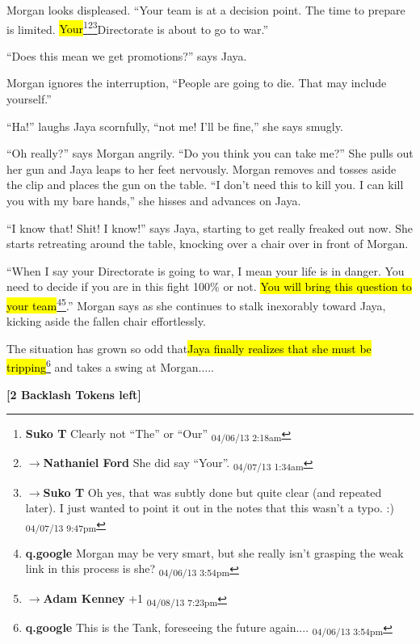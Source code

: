 Morgan looks displeased.  ``Your team is at a decision point.  The time to prepare is limited.  \hl{Your}\footnote{\textbf{Suko T }Clearly not ``The'' or ``Our'' \textsubscript{04/06/13 2:18am}}\footnote{$\rightarrow$\textbf{Nathaniel Ford }She did say ``Your''. \textsubscript{04/07/13 1:34am}}\footnote{$\rightarrow$\textbf{Suko T }Oh yes, that was subtly done but quite clear (and repeated later).  I just wanted to point it out in the notes that this wasn't a typo.  :) \textsubscript{04/07/13 9:47pm}}Directorate is about to go to war.''

``Does this mean we get promotions?'' says Jaya.

Morgan ignores the interruption, ``People are going to die.  That may include yourself.''

``Ha!'' laughs Jaya scornfully, ``not me!  I'll be fine,'' she says smugly.

``Oh really?'' says Morgan angrily.  ``Do you think you can take me?''  She pulls out her gun and Jaya leaps to her feet nervously.  Morgan removes and tosses aside the clip and places the gun on the table.  ``I don't need this to kill you.  I can kill you with my bare hands,'' she hisses and advances on Jaya.

``I know that!  Shit!  I know!'' says Jaya, starting to get really freaked out now.  She starts retreating around the table, knocking over a chair over in front of Morgan.

``When I say your Directorate is going to war, I mean your life is in danger.  You need to decide if you are in this fight 100\% or not.  \hl{You will bring this question to your team}\footnote{\textbf{q.google }Morgan may be very smart, but she really isn't grasping the weak link in this process is she? \textsubscript{04/06/13 3:54pm}}\footnote{$\rightarrow$\textbf{Adam Kenney }+1 \textsubscript{04/08/13 7:23pm}}.''  Morgan says as she continues to stalk inexorably toward Jaya, kicking aside the fallen chair effortlessly.



The situation has grown so odd that\hl{Jaya finally realizes that she must be tripping}\footnote{\textbf{q.google }This is the Tank, foreseeing the future again.... \textsubscript{04/06/13 3:54pm}} and takes a swing at Morgan.....



\textbf{{[}2 Backlash Tokens left{]}}






